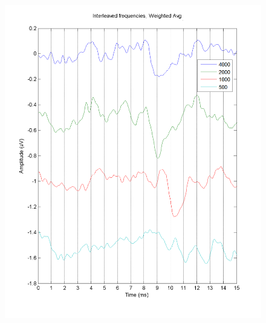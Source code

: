 \begin{figure}[H]
\begin{minipage}{0.48\textwidth}
        \includegraphics[width=\textwidth]{images/Interleaved75dbGHINOMA-2.png}
    \end{minipage}
    
    \vspace{0.2cm}
    

\end{figure}
